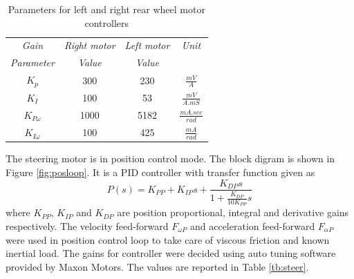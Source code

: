   	  \begin{table}[!htbp]
  		\caption{Parameters for left and right rear wheel motor controllers  }
  		\label{tb:motorPara}
  		\centering
  		\begin{tabular}{c c c c}
  			\hline
  			\emph{Gain}  & \emph{ Right motor}  & \emph{ Left motor}& \emph{Unit} \\
  			\emph{ Parameter}  & \emph{ Value} & \emph{ Value} & \emph{\space} \\
  			\hline
  			$K_p$  & 300 & 230 &  $\frac{mV}{A}$ \\ 
  			$K_I $ & 100 & 53 & $\frac{mV}{A.mS}$ \\
  			$K_{P\omega}$& 1000 & 5182 & $ \frac{mA.sec}{rad}$\\
  			$K_{I\omega}$&100 & 425& $\frac{mA}{rad}$\\
  			\hline
  		\end{tabular}
  	\end{table}






The steering motor is in position control mode. The block digram is shown in Figure \ref{fig:posloop}. It is a PID controller with transfer function given as 
\begin{equation}
P(s)=K_{PP}+K_{IP}s+\frac{K_{DP}s}{1+\frac{K_{DP}}{10 K_{PP}}s}
\end{equation}
where $K_{PP}$, $K_{IP}$ and $K_{DP}$ are position proportional, integral and derivative gains respectively. The velocity feed-forward $F_{\omega P}$ and acceleration feed-forward $F_{\alpha P}$ were used in position control loop to take care of viscous friction and known inertial load. The gains for controller were decided using auto tuning software provided by Maxon Motors. The values are reported in Table \ref{tb:steer}.

